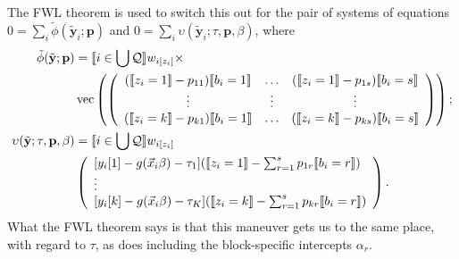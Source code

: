 \documentclass{article}
\DeclarePairedDelimiter{\indicator}{\llbracket}{\rrbracket}
\newcommand{\owt}[1][z_i]{\ensuremath{w_{i[#1]}}}
\begin{document}
The FWL theorem is used to switch this out for the pair of systems of
equations $0 = \sum_{i}\tilde{\phi}(\tilde{\mathbf{y}}_{i}; \mathbf{p})$ and
$0= \sum_{i}\upsilon(\tilde{\mathbf{y}}_{i}; \tau, \mathbf{p},
\beta)$,  where
\begin{align}
  \tilde{\phi}(\tilde{\mathbf{y}}; \mathbf{p}) &=
                                                 \indicator{i \in \bigcup \mathcal{Q}} \owt{} \times \nonumber \\
  &\operatorname{vec}\left(%
                                                 \left(
                                                 \begin{array}{ccc}
                                                   (\indicator{z_{i}=1}-p_{11})\indicator{b_{i}=1}&\ldots&(\indicator{z_{i}=1}-p_{1s})\indicator{b_{i}=s}
                                                   \\
                                                   \vdots & \vdots &
                                                                     \vdots
                                                   \\
                                                   (\indicator{z_{i}=k}-p_{k1})\indicator{b_{i}=1}&\ldots&(\indicator{z_{i}=k}-p_{ks})\indicator{b_{i}=s}\\                                                   
                                                 \end{array}
  \right)%
  \right) ;\nonumber \\
  \upsilon(\tilde{\mathbf{y}}; \tau, \mathbf{p}, \beta) &=
\indicator{i \in \bigcup \mathcal{Q}}\owt{} \nonumber \\
&\left(
                                             \begin{array}{l}                                               
           [y_{i}[1]
                                               -
                                               g(\vec{x}_{i}\beta)-\tau_{1}](
                                               \indicator{z_{i}=1} - \sum_{r=1}^{s}p_{1r}\indicator{b_{i}=r})\\
                  \vdots \\
{}           [y_{i}[k]
                                               - g(\vec{x}_{i}\beta) -
                                               \tau_{K}](\indicator{z_{i}=k}
                                               - \sum_{r=1}^{s}p_{kr}\indicator{b_{i}=r})\\                                             \end{array}
\right) . \label{eq:upsilondef}
\end{align}
What the FWL theorem says is that this maneuver gets us to the same
place, with regard to $\tau$, as does including the block-specific
intercepts $\alpha_{r}$.
\end{document}
